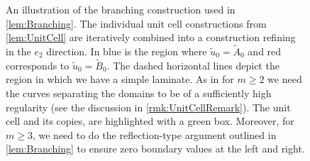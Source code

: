 \documentclass[a4paper, 10pt, twoside, notitlepage]{amsart}
\theoremstyle{plain}
\begin{document}
\begin{figure}
			\caption{An illustration of the branching construction used in \cref{lem:Branching}. The individual unit cell constructions from \cref{lem:UnitCell} are iteratively combined into a
				construction refining in the $e_2$ direction. In blue is the region where $\tilde{u}_0 = \tilde{A}_0$ and red corresponds to $\tilde{u}_0 = \tilde{B}_0$. The dashed horizontal lines depict the region in which we have a simple laminate. As in \cite{CC15} for $m\geq 2$ we need the curves separating the domains to be of a sufficiently high regularity (see the discussion in
				\cref{rmk:UnitCellRemark}). The unit cell and its copies, are highlighted with a green box. Moreover, for $m \geq 3$, we need to do the reflection-type argument outlined in \cref{lem:Branching} to ensure zero boundary values at the left and right.}
                              \label{fig:branching}
                            \end{figure}
		
\end{document}
